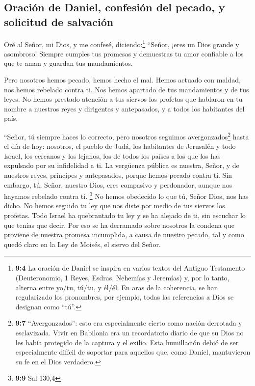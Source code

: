 \hypertarget{oraciuxf3n-de-daniel-confesiuxf3n-del-pecado-y-solicitud-de-salvaciuxf3n}{%
\subsection{Oración de Daniel, confesión del pecado, y solicitud de
salvación}\label{oraciuxf3n-de-daniel-confesiuxf3n-del-pecado-y-solicitud-de-salvaciuxf3n}}

 Oré al Señor, mi Dios, y me confesé, diciendo:\footnote{\textbf{9:4}
  La oración de Daniel se inspira en varios textos del Antiguo
  Testamento (Deuteronomio, 1 Reyes, Esdras, Nehemías y Jeremías) y, por
  lo tanto, alterna entre yo/tu, tú/tu, y él/él. En aras de la
  coherencia, se han regularizado los pronombres, por ejemplo, todas las
  referencias a Dios se designan como ``tú''.} ``Señor, ¡eres un Dios
grande y asombroso! Siempre cumples tus promesas y demuestras tu amor
confiable a los que te aman y guardan tus mandamientos.

 Pero nosotros hemos pecado, hemos hecho el mal. Hemos
actuado con maldad, nos hemos rebelado contra ti. Nos hemos apartado de
tus mandamientos y de tus leyes.  No hemos prestado
atención a tus siervos los profetas que hablaron en tu nombre a nuestros
reyes y dirigentes y antepasados, y a todos los habitantes del país.

 ``Señor, tú siempre haces lo correcto, pero nosotros
seguimos avergonzados\footnote{\textbf{9:7} ``Avergonzados'': esto era
  especialmente cierto como nación derrotada y esclavizada. Vivir en
  Babilonia era un recordatorio diario de que su Dios no les había
  protegido de la captura y el exilio. Esta humillación debió de ser
  especialmente difícil de soportar para aquellos que, como Daniel,
  mantuvieron su fe en el Dios verdadero.} hasta el día de hoy:
nosotros, el pueblo de Judá, los habitantes de Jerusalén y todo Israel,
los cercanos y los lejanos, los de todos los países a los que los has
expulsado por su infidelidad a ti.  La vergüenza pública
es nuestra, Señor, y de nuestros reyes, príncipes y antepasados, porque
hemos pecado contra ti.  Sin embargo, tú, Señor, nuestro
Dios, eres compasivo y perdonador, aunque nos hayamos rebelado contra
ti. \footnote{\textbf{9:9} Sal 130,4}  No hemos obedecido
lo que tú, Señor Dios, nos has dicho. No hemos seguido tu ley que nos
diste por medio de tus siervos los profetas.  Todo Israel
ha quebrantado tu ley y se ha alejado de ti, sin escuchar lo que tenías
que decir. Por eso se ha derramado sobre nosotros la condena que
proviene de nuestra promesa incumplida, a causa de nuestro pecado, tal y
como quedó claro en la Ley de Moisés, el siervo del Señor.

